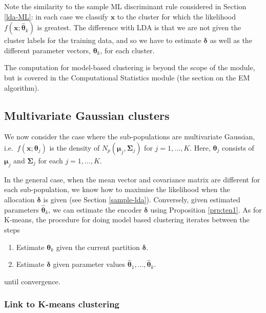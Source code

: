 \documentclass[
]{book}
\theoremstyle{definition}
\theoremstyle{definition}
\theoremstyle{definition}
\theoremstyle{definition}
\theoremstyle{remark}
\begin{document}
Note the similarity to the sample ML discriminant rule considered in Section \ref{lda-ML}: in each case we classify \(\mathbf x\) to the cluster for which the likelihood \(f(\mathbf x; \hat{\boldsymbol \theta}_k)\) is greatest. The difference with LDA is that we are not given the cluster labels for the training data, and so we have to estimate \(\boldsymbol \delta\) as well as the different parameter vectors, \(\boldsymbol \theta_k\), for each cluster.

The computation for model-based clustering is beyond the scope of the module, but is covered in the Computational Statistics module (the section on the EM algorithm).

\hypertarget{multivariate-gaussian-clusters}{%
\subsection{Multivariate Gaussian clusters}\label{multivariate-gaussian-clusters}}

We now consider the case where the sub-populations are multivariate Gaussian, i.e.~\(f(\mathbf x; \boldsymbol \theta_j)\) is the density of \(N_p({\boldsymbol{\mu}}_j, \boldsymbol{\Sigma}_j)\) for \(j=1, \ldots , K\). Here, \(\boldsymbol \theta_j\) consists of \({\boldsymbol{\mu}}_j\) and \(\boldsymbol{\Sigma}_j\) for each \(j=1, \ldots , K\).

In the general case, when the mean vector and covariance matrix are different for each sub-population, we know how to maximise the likelihood when the allocation \(\boldsymbol \delta\) is given (see Section \ref{sample-lda}). Conversely, given estimated parameters \(\hat{\boldsymbol \theta}_k\), we can estimate the encoder \(\boldsymbol \delta\) using Proposition \ref{prp:ten1}. As for K-means, the procedure for doing model based clustering iterates between the steps

\begin{enumerate}
\def\labelenumi{\arabic{enumi}.}
\item
  Estimate \(\boldsymbol \theta_k\) given the current partition \(\boldsymbol \delta\).
\item
  Estimate \(\boldsymbol \delta\) given parameter values \(\hat{\boldsymbol \theta}_1, \ldots, \hat{\boldsymbol \theta}_k\).
\end{enumerate}

until convergence.

\hypertarget{link-to-k-means-clustering}{%
\subsubsection{Link to K-means clustering}\label{link-to-k-means-clustering}}
\end{document}
